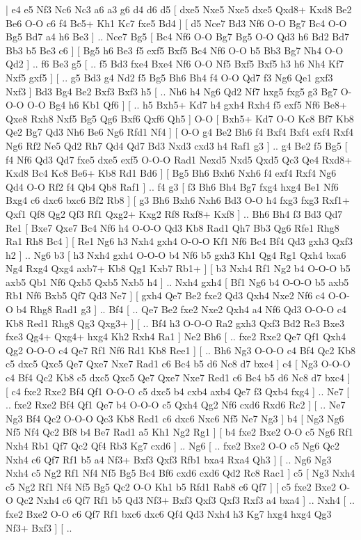 \makegametitle 
|   e4   e5    Nf3   Nc6    Nc3   a6    a3   g6    d4   d6    d5 [  dxe5 Nxe5  Nxe5 dxe5  Qxd8+ Kxd8  Be2 Be6  O-O c6  f4 Bc5+  Kh1 Kc7  fxe5 Bd4   ]  [  d5 Nce7  Bd3 Nf6  O-O Bg7  Bc4 O-O  Bg5 Bd7  a4 h6  Be3   ] .. Nce7    Bg5 [  Bc4 Nf6  O-O Bg7  Bg5 O-O  Qd3 h6  Bd2 Bd7  Bb3 b5  Be3 c6   ]  [  Bg5 h6  Be3 f5  exf5 Bxf5  Bc4 Nf6  O-O b5  Bb3 Bg7  Nh4 O-O  Qd2   ] .. f6    Be3   g5 [ .. f5  Bd3 fxe4  Bxe4 Nf6  O-O Nf5  Bxf5 Bxf5  h3 h6  Nh4 Kf7  Nxf5 gxf5   ]  [ .. g5  Bd3 g4  Nd2 f5  Bg5 Bh6  Bh4 f4  O-O Qd7  f3 Ng6  Qe1 gxf3  Nxf3   ]  Bd3   Bg4    Be2   Bxf3    Bxf3   h5 [ .. Nh6  h4 Ng6  Qd2 Nf7  hxg5 fxg5  g3 Bg7  O-O-O O-O  Bg4 h6  Kb1 Qf6   ]  [ .. h5  Bxh5+ Kd7  h4 gxh4  Rxh4 f5  exf5 Nf6  Be8+ Qxe8  Rxh8 Nxf5  Bg5 Qg6  Bxf6 Qxf6  Qh5   ]  O-O [  Bxh5+ Kd7  O-O Kc8  Bf7 Kb8  Qe2 Bg7  Qd3 Nh6  Be6 Ng6  Rfd1 Nf4   ]  [  O-O g4  Be2 Bh6  f4 Bxf4  Bxf4 exf4  Rxf4 Ng6  Rf2 Ne5  Qd2 Rh7  Qd4 Qd7  Bd3 Nxd3  cxd3 h4  Raf1 g3   ] .. g4    Be2   f5    Bg5 [  f4 Nf6  Qd3 Qd7  fxe5 dxe5  exf5 O-O-O  Rad1 Nexd5  Nxd5 Qxd5  Qc3 Qe4  Rxd8+ Kxd8  Bc4 Kc8  Be6+ Kb8  Rd1 Bd6   ]  [  Bg5 Bh6  Bxh6 Nxh6  f4 exf4  Rxf4 Ng6  Qd4 O-O  Rf2 f4  Qb4 Qb8  Raf1   ] .. f4    g3 [  f3 Bh6  Bh4 Bg7  fxg4 hxg4  Be1 Nf6  Bxg4 c6  dxc6 bxc6  Bf2 Rb8   ]  [  g3 Bh6  Bxh6 Nxh6  Bd3 O-O  h4 fxg3  fxg3 Rxf1+  Qxf1 Qf8  Qg2 Qf3  Rf1 Qxg2+  Kxg2 Rf8  Rxf8+ Kxf8   ] .. Bh6    Bh4   f3    Bd3   Qd7    Re1 [  Bxe7 Qxe7  Bc4 Nf6  h4 O-O-O  Qd3 Kb8  Rad1 Qh7  Bb3 Qg6  Rfe1 Rhg8  Ra1 Rh8  Bc4   ]  [  Re1 Ng6  h3 Nxh4  gxh4 O-O-O  Kf1 Nf6  Bc4 Bf4  Qd3 gxh3  Qxf3 h2   ] .. Ng6    b3 [  h3 Nxh4  gxh4 O-O-O  b4 Nf6  b5 gxh3  Kh1 Qg4  Rg1 Qxh4  bxa6 Ng4  Rxg4 Qxg4  axb7+ Kb8  Qg1 Kxb7  Rb1+   ]  [  b3 Nxh4  Rf1 Ng2  b4 O-O-O  b5 axb5  Qb1 Nf6  Qxb5 Qxb5  Nxb5 h4   ] .. Nxh4    gxh4 [  Bf1 Ng6  b4 O-O-O  b5 axb5  Rb1 Nf6  Bxb5 Qf7  Qd3 Ne7   ]  [  gxh4 Qe7  Be2 fxe2  Qd3 Qxh4  Nxe2 Nf6  c4 O-O-O  b4 Rhg8  Rad1 g3   ] .. Bf4 [ .. Qe7  Be2 fxe2  Nxe2 Qxh4  a4 Nf6  Qd3 O-O-O  c4 Kb8  Red1 Rhg8  Qg3 Qxg3+   ]  [ .. Bf4  h3 O-O-O  Ra2 gxh3  Qxf3 Bd2  Re3 Bxe3  fxe3 Qg4+  Qxg4+ hxg4  Kh2 Rxh4  Ra1   ]  Ne2   Bh6 [ .. fxe2  Rxe2 Qe7  Qf1 Qxh4  Qg2 O-O-O  c4 Qe7  Rf1 Nf6  Rd1 Kb8  Ree1   ]  [ .. Bh6  Ng3 O-O-O  c4 Bf4  Qc2 Kb8  c5 dxc5  Qxc5 Qe7  Qxe7 Nxe7  Rad1 c6  Bc4 b5  d6 Nc8  d7 bxc4   ]  c4 [  Ng3 O-O-O  c4 Bf4  Qc2 Kb8  c5 dxc5  Qxc5 Qe7  Qxe7 Nxe7  Red1 c6  Bc4 b5  d6 Nc8  d7 bxc4   ]  [  c4 fxe2  Rxe2 Bf4  Qf1 O-O-O  c5 dxc5  b4 cxb4  axb4 Qe7  f3 Qxb4  fxg4   ] .. Ne7 [ .. fxe2  Rxe2 Bf4  Qf1 Qe7  b4 O-O-O  c5 Qxh4  Qg2 Nf6  cxd6 Rxd6  Rc2   ]  [ .. Ne7  Ng3 Bf4  Qc2 O-O-O  Qc3 Kb8  Red1 c6  dxc6 Nxc6  Nf5 Ne7  Ng3   ]  b4 [  Ng3 Ng6  Nf5 Nf4  Qc2 Bf8  b4 Be7  Rad1 a5  Kh1 Ng2  Rg1   ]  [  b4 fxe2  Bxe2 O-O  c5 Ng6  Rf1 Nxh4  Rb1 Qf7  Qc2 Qf4  Rb3 Kg7  cxd6   ] .. Ng6 [ .. fxe2  Bxe2 O-O  c5 Ng6  Qc2 Nxh4  c6 Qf7  Rf1 b5  a4 Nf3+  Bxf3 Qxf3  Rfb1 bxa4  Rxa4 Qh3   ]  [ .. Ng6  Ng3 Nxh4  c5 Ng2  Rf1 Nf4  Nf5 Bg5  Bc4 Bf6  cxd6 cxd6  Qd2 Rc8  Rac1   ]  c5 [  Ng3 Nxh4  c5 Ng2  Rf1 Nf4  Nf5 Bg5  Qc2 O-O  Kh1 b5  Rfd1 Rab8  c6 Qf7   ]  [  c5 fxe2  Bxe2 O-O  Qc2 Nxh4  c6 Qf7  Rf1 b5  Qd3 Nf3+  Bxf3 Qxf3  Qxf3 Rxf3  a4 bxa4   ] .. Nxh4 [ .. fxe2  Bxe2 O-O  c6 Qf7  Rf1 bxc6  dxc6 Qf4  Qd3 Nxh4  h3 Kg7  hxg4 hxg4  Qg3 Nf3+  Bxf3   ]  [ .. 